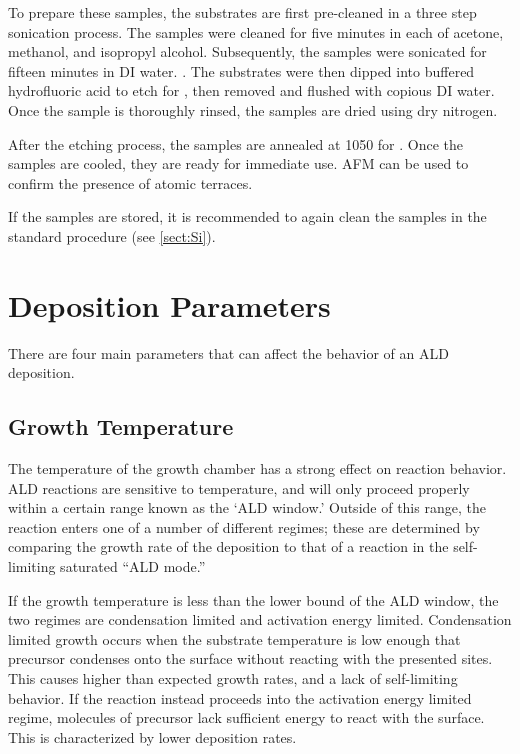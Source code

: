 To prepare these samples, the substrates are first pre-cleaned in a three step sonication process. The samples were cleaned for five minutes in each of acetone, methanol, and isopropyl alcohol. Subsequently, the samples were sonicated for fifteen minutes in DI water. . The substrates were then dipped into buffered hydrofluoric acid to etch for , then removed and flushed with copious DI water.  Once the sample is thoroughly rinsed, the samples are dried using dry nitrogen. 

After the etching process, the samples are annealed at 1050\degC{} for . Once the samples are cooled, they are ready for immediate use. AFM can be used to confirm the presence of atomic terraces. 

If the samples are stored, it is recommended to again clean the samples in the standard procedure (see \vref{sect:Si}).


\section{Deposition Parameters}
\label{sec:SampFab-DepParams}

There are four main parameters that can affect the behavior of an ALD deposition. 


\subsection{Growth Temperature}

The temperature of the growth chamber has a strong effect on reaction behavior. ALD reactions are sensitive to temperature, and will only proceed properly within a certain range known as the `ALD window.' Outside of this range, the reaction enters one of a number of different regimes; these are determined by comparing the growth rate of the deposition to that of a reaction in the self-limiting saturated ``ALD mode.'' 

If the growth temperature is less than the lower bound of the ALD window, the two regimes are condensation limited and activation energy limited. Condensation limited growth occurs when the substrate temperature is low enough that precursor condenses onto the surface without reacting with the presented sites. This causes higher than expected growth rates, and a lack of self-limiting behavior. If the reaction instead proceeds into the activation energy limited regime, molecules of precursor lack sufficient energy to react with the surface. This is characterized by lower deposition rates. 

